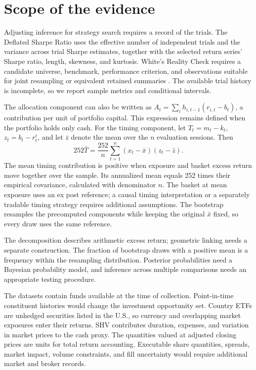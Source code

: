 \documentclass{article}
\newif\ifquantcortexreview
\begin{document}
\FloatBarrier


\ifquantcortexreview\else
  \clearpage
\fi

\appendix
\raggedbottom

\section{Scope of the evidence}
\label{app:scope}

Adjusting inference for strategy search requires a record of the trials. The Deflated Sharpe Ratio uses the effective number of independent trials and the variance across trial Sharpe estimates, together with the selected return series' Sharpe ratio, length, skewness, and kurtosis. White's Reality Check requires a candidate universe, benchmark, performance criterion, and observations suitable for joint resampling or equivalent retained summaries \citep{white2000reality,bailey2014deflated}. The available trial history is incomplete, so we report sample metrics and conditional intervals.

The allocation component can also be written as
$A_t=\sum_i h_{i,t-1}(r_{i,t}-b_t)$, a contribution per unit of portfolio capital.
This expression remains defined when the portfolio holds only cash.
For the timing component, let $T_t=m_t-k_t$, $z_t=b_t-r_t^c$, and let
$\bar{z}$ denote the mean over the $n$ evaluation sessions. Then
\begin{equation}
  252\bar{T}
  = \frac{252}{n}\sum_{t=1}^{n}(x_t-\bar{x})(z_t-\bar{z}).
  \label{eq:timing-covariance}
\end{equation}
The mean timing contribution is positive when exposure and basket excess return
move together over the sample. Its annualized mean equals 252 times their
empirical covariance, calculated with denominator $n$. The basket at mean
exposure uses an ex post reference; a causal timing interpretation or a
separately tradable timing strategy requires additional assumptions. The
bootstrap resamples the precomputed components while keeping the original
$\bar{x}$ fixed, so every draw uses the same reference.

The decomposition describes arithmetic excess return; geometric linking needs a separate construction. The fraction of bootstrap draws with a positive mean is a frequency within the resampling distribution. Posterior probabilities need a Bayesian probability model, and inference across multiple comparisons needs an appropriate testing procedure.

The datasets contain funds available at the time of collection. Point-in-time constituent histories would change the investment opportunity set. Country ETFs are unhedged securities listed in the U.S., so currency and overlapping market exposures enter their returns. SHV contributes duration, expenses, and variation in market prices to the cash proxy. The quantities valued at adjusted closing prices are units for total return accounting. Executable share quantities, spreads, market impact, volume constraints, and fill uncertainty would require additional market and broker records.
\end{document}
